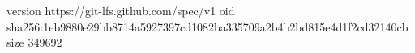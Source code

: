 version https://git-lfs.github.com/spec/v1
oid sha256:1eb9880e29bb8714a5927397cd1082ba335709a2b4b2bd815e4d1f2cd32140cb
size 349692
